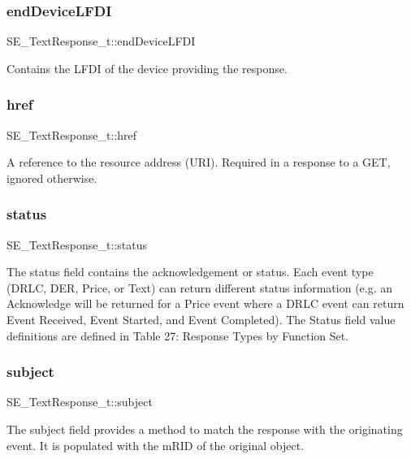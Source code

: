 \subsubsection{\texorpdfstring{end\+Device\+L\+F\+DI}{endDeviceLFDI}}
{\footnotesize\ttfamily S\+E\+\_\+\+Text\+Response\+\_\+t\+::end\+Device\+L\+F\+DI}

Contains the L\+F\+DI of the device providing the response. \mbox{\label{group__TextResponse_gaa17772b7549b6e16b7597dc1351bdfda}} 
\subsubsection{\texorpdfstring{href}{href}}
{\footnotesize\ttfamily S\+E\+\_\+\+Text\+Response\+\_\+t\+::href}

A reference to the resource address (U\+RI). Required in a response to a G\+ET, ignored otherwise. \mbox{\label{group__TextResponse_ga80b24a0bd8f2e030d06c5ba2512a1b1a}} 
\subsubsection{\texorpdfstring{status}{status}}
{\footnotesize\ttfamily S\+E\+\_\+\+Text\+Response\+\_\+t\+::status}

The status field contains the acknowledgement or status. Each event type (D\+R\+LC, D\+ER, Price, or Text) can return different status information (e.\+g. an Acknowledge will be returned for a Price event where a D\+R\+LC event can return Event Received, Event Started, and Event Completed). The Status field value definitions are defined in Table 27\+: Response Types by Function Set. \mbox{\label{group__TextResponse_ga20b727bc040f883df2fcdaf506f859ab}} 
\subsubsection{\texorpdfstring{subject}{subject}}
{\footnotesize\ttfamily S\+E\+\_\+\+Text\+Response\+\_\+t\+::subject}

The subject field provides a method to match the response with the originating event. It is populated with the m\+R\+ID of the original object. 